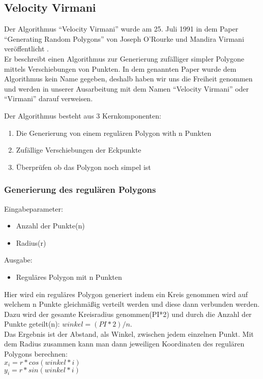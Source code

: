 
\subsection{Velocity Virmani}
Der Algorithmus \enquote{Velocity Virmani} wurde am 25. Juli 1991 in dem Paper \enquote{Generating Random Polygons} von Joseph O'Rourke und Mandira Virmani veröffentlicht \cite{virmani91polygons}.\smallskip \\ 
Er beschreibt einen Algorithmus zur Generierung zufälliger simpler Polygone mittels Verschiebungen von Punkten. In dem genannten Paper wurde dem Algorithmus kein Name gegeben, deshalb haben wir uns die Freiheit genommen und werden in unserer Ausarbeitung mit dem Namen \enquote{Velocity Virmani} oder \enquote{Virmani} darauf verweisen.

Der Algorithmus besteht aus 3 Kernkomponenten:
\begin{enumerate}
	\item Die Generierung von einem regulären Polygon with n Punkten
	\item Zufällige Verschiebungen der Eckpunkte
	\item Überprüfen ob das Polygon noch simpel ist
\end{enumerate}

\subsubsection{Generierung des regulären Polygons}
Eingabeparameter: 
\begin{itemize}
	\item Anzahl der Punkte(n)
	\item Radius(r)
\end{itemize}
Ausgabe:
\begin{itemize} 
	\item Reguläres Polygon mit n Punkten
\end{itemize}
Hier wird ein reguläres Polygon generiert indem ein Kreis genommen wird auf welchem n Punkte gleichmäßig verteilt werden und diese dann verbunden werden. Dazu wird der gesamte Kreisradius genommen(PI*2) und durch die Anzahl der Punkte geteilt(n): $winkel = (PI * 2) / n$.\\ 
Das Ergebnis ist der Abstand, als Winkel, zwischen jedem einzelnen Punkt.
Mit dem Radius zusammen kann man dann jeweiligen Koordinaten des regulären Polygons berechnen:\\
$x_i = r * cos(winkel * i)$\\
$y_i = r * sin(winkel * i)$

